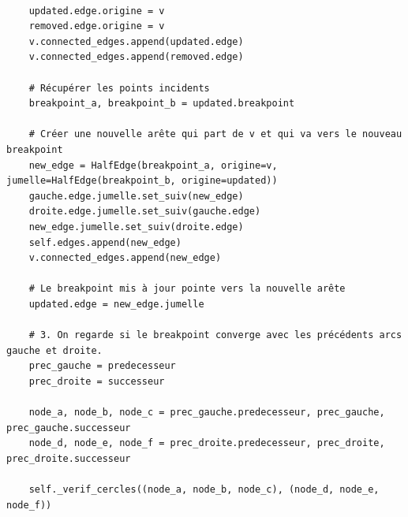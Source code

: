 \begin{frame}[fragile]
\begin{code}
\begin{verbatim}

    updated.edge.origine = v
    removed.edge.origine = v
    v.connected_edges.append(updated.edge)
    v.connected_edges.append(removed.edge)

    # Récupérer les points incidents
    breakpoint_a, breakpoint_b = updated.breakpoint

    # Créer une nouvelle arête qui part de v et qui va vers le nouveau breakpoint
    new_edge = HalfEdge(breakpoint_a, origine=v, jumelle=HalfEdge(breakpoint_b, origine=updated))
    gauche.edge.jumelle.set_suiv(new_edge)
    droite.edge.jumelle.set_suiv(gauche.edge)
    new_edge.jumelle.set_suiv(droite.edge)
    self.edges.append(new_edge)
    v.connected_edges.append(new_edge)

    # Le breakpoint mis à jour pointe vers la nouvelle arête
    updated.edge = new_edge.jumelle

    # 3. On regarde si le breakpoint converge avec les précédents arcs gauche et droite.
    prec_gauche = predecesseur
    prec_droite = successeur

    node_a, node_b, node_c = prec_gauche.predecesseur, prec_gauche, prec_gauche.successeur
    node_d, node_e, node_f = prec_droite.predecesseur, prec_droite, prec_droite.successeur

    self._verif_cercles((node_a, node_b, node_c), (node_d, node_e, node_f))
\end{verbatim}
\end{code}
\end{frame}

